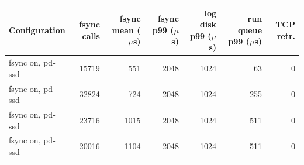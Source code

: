\begin{tabular}{@{}lrrrrrr@{}}
\toprule
Configuration & fsync calls & fsync mean ($\mu$s) & fsync p99 ($\mu$s) & log disk p99 ($\mu$s) & run queue p99 ($\mu$s) & TCP retr. \\
\midrule
fsync on, pd-ssd & 15719 & 551 & 2048 & 1024 & 63 & 0 \\
fsync on, pd-ssd & 32824 & 724 & 2048 & 1024 & 255 & 0 \\
fsync on, pd-ssd & 23716 & 1015 & 2048 & 1024 & 511 & 0 \\
fsync on, pd-ssd & 20016 & 1104 & 2048 & 1024 & 511 & 0 \\
\bottomrule
\end{tabular}
